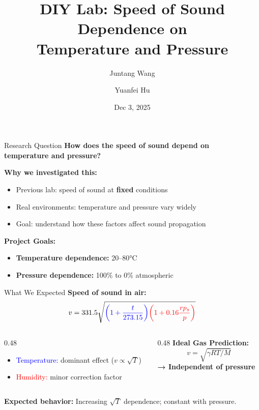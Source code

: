 \documentclass[12pt]{beamer}
\title[Speed of Sound Dependence]{DIY Lab: Speed of Sound Dependence on\\Temperature and Pressure}
\author[J. Wang and Y. Hu]{Juntang Wang \and Yuanfei Hu}
\institute[PHYS 121]{PHYS 121 -- Integrated Science}
\date{Dec 3, 2025}
\begin{document}
\begin{frame}
\titlepage
\end{frame}

\begin{frame}{Research Question}
\centering
{\Large 
\textbf{How does the speed of sound depend on\\temperature and pressure?}
}

\vspace{0.6cm}
\textbf{Why we investigated this:}
\begin{itemize}
    \item Previous lab: speed of sound at \textbf{fixed} conditions
    \item Real environments: temperature and pressure vary widely
    \item Goal: understand how these factors affect sound propagation
\end{itemize}

\vspace{0.4cm}
\textbf{Project Goals:}
\begin{itemize}
    \item \textbf{Temperature dependence:} 20--80°C
    \item \textbf{Pressure dependence:} 100\% to 0\% atmospheric
\end{itemize}
\end{frame}

\begin{frame}{What We Expected}
\textbf{Speed of sound in air:}
\begin{equation*}
v = 331.5 \sqrt{\textcolor{blue}{\left(1 + \frac{t}{273.15}\right)} \textcolor{red}{\left(1 + 0.16\frac{rp_s}{p}\right)}}
\end{equation*}

\begin{columns}
\begin{column}{0.48\textwidth}
\begin{itemize}
    \item \textcolor{blue}{Temperature:} dominant effect ($v \propto \sqrt{T}$)
    \item \textcolor{red}{Humidity:} minor correction factor
\end{itemize}
\end{column}

\begin{column}{0.48\textwidth}
\textbf{Ideal Gas Prediction:}
\[
v = \sqrt{\gamma RT/M}
\]
\textbf{→ Independent of pressure}
\end{column}
\end{columns}

\vspace{0.3cm}
\textbf{Expected behavior:}  
Increasing $\sqrt{T}$ dependence; constant with pressure.
\end{frame}
\end{document}

